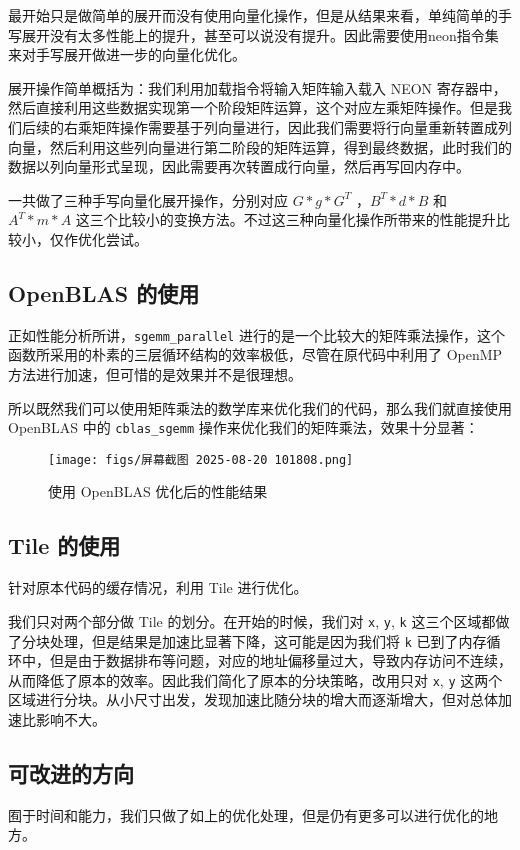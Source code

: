 \documentclass[a4paper,12pt,scheme=plain]{ctexart}
\newcommand{\inlinecode}[1]{\colorbox{gray!10}{\lstinline|#1|}}
\numberwithin{equation}{section} %
\begin{document}
最开始只是做简单的展开而没有使用向量化操作，但是从结果来看，单纯简单的手写展开没有太多性能上的提升，甚至可以说没有提升。因此需要使用neon指令集来对手写展开做进一步的向量化优化。

展开操作简单概括为：我们利用加载指令将输入矩阵输入载入 NEON 寄存器中，然后直接利用这些数据实现第一个阶段矩阵运算，这个对应左乘矩阵操作。但是我们后续的右乘矩阵操作需要基于列向量进行，因此我们需要将行向量重新转置成列向量，然后利用这些列向量进行第二阶段的矩阵运算，得到最终数据，此时我们的数据以列向量形式呈现，因此需要再次转置成行向量，然后再写回内存中。

一共做了三种手写向量化展开操作，分别对应 $G*g*G^T$ ，$B^T*d*B$ 和 $A^T*m*A$ 这三个比较小的变换方法。不过这三种向量化操作所带来的性能提升比较小，仅作优化尝试。

\subsection{OpenBLAS 的使用}

正如性能分析所讲，\inlinecode{sgemm_parallel} 进行的是一个比较大的矩阵乘法操作，这个函数所采用的朴素的三层循环结构的效率极低，尽管在原代码中利用了 OpenMP 方法进行加速，但可惜的是效果并不是很理想。

所以既然我们可以使用矩阵乘法的数学库来优化我们的代码，那么我们就直接使用 OpenBLAS 中的 \inlinecode{cblas_sgemm} 操作来优化我们的矩阵乘法，效果十分显著：

\begin{figure}[h]
\centering
\texttt{[image: figs/屏幕截图 2025-08-20 101808.png]}
\caption{使用 OpenBLAS 优化后的性能结果}
\label{fig:openblas}
\end{figure}

\subsection{Tile 的使用}
针对原本代码的缓存情况，利用 Tile 进行优化。

我们只对两个部分做 Tile 的划分。在开始的时候，我们对 \inlinecode{x}, \inlinecode{y}, \inlinecode{k} 这三个区域都做了分块处理，但是结果是加速比显著下降，这可能是因为我们将 \inlinecode{k} 已到了内存循环中，但是由于数据排布等问题，对应的地址偏移量过大，导致内存访问不连续，从而降低了原本的效率。因此我们简化了原本的分块策略，改用只对 \inlinecode{x}, \inlinecode{y} 这两个区域进行分块。从小尺寸出发，发现加速比随分块的增大而逐渐增大，但对总体加速比影响不大。

\subsection{可改进的方向}
囿于时间和能力，我们只做了如上的优化处理，但是仍有更多可以进行优化的地方。
\end{document}
